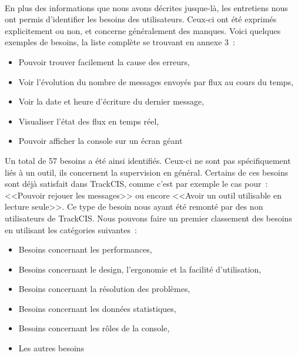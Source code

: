 			\paragraph{}%
			En plus des informations que nous avons décrites jusque-là, les entretiens
			nous ont permis d'identifier les besoins des utilisateurs. Ceux-ci ont été
			exprimés explicitement ou non, et concerne généralement des manques. Voici
			quelques exemples de besoins, la liste complète se trouvant en annexe 3~:
			\begin{itemize}
			  \item Pouvoir trouver facilement la cause des erreurs,
			  \item Voir l'évolution du nombre de messages envoyés par flux au cours du
			  temps,
			  \item Voir la date et heure d'écriture du dernier message,
			  \item Visualiser l'état des flux en temps réel,
			  \item Pouvoir afficher la console sur un écran géant
			\end{itemize}
			Un total de 57 besoins a été ainsi identifiés. Ceux-ci ne sont pas
			spécifiquement liés à un outil, ils concernent la supervision
			en général. Certains de ces besoins sont déjà satisfait dans
			TrackCIS, comme c'est par exemple le cas pour~: <<Pouvoir rejouer les
			messages>> ou encore <<Avoir un outil utilisable en lecture seule>>. Ce type de
			besoin nous ayant été remonté par des non utilisateurs de TrackCIS. Nous
			pouvons faire un premier classement des besoins en utilisant les catégories
			suivantes~:
			\begin{itemize}
			  \item Besoins concernant les performances,
			  \item Besoins concernant le design, l'ergonomie et la facilité
			  d'utilisation,
			  \item Besoins concernant la résolution des problèmes,
			  \item Besoins concernant les données statistiques,
			  \item Besoins concernant les rôles de la console,
			  \item Les autres besoins
			\end{itemize}
			
